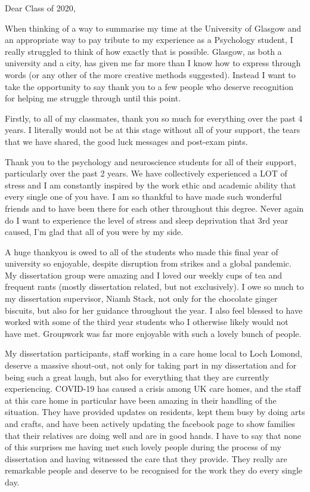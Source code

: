 \documentclass[]{book}
\begin{document}
\begin{info2}
Dear Class of 2020,

When thinking of a way to summarise my time at the University of Glasgow
and an appropriate way to pay tribute to my experience as a Psychology
student, I really struggled to think of how exactly that is possible.
Glasgow, as both a university and a city, has given me far more than I
know how to express through words (or any other of the more creative
methods suggested). Instead I want to take the opportunity to say thank
you to a few people who deserve recognition for helping me struggle
through until this point.

Firstly, to all of my classmates, thank you so much for everything over
the past 4 years. I literally would not be at this stage without all of
your support, the tears that we have shared, the good luck messages and
post-exam pints.

Thank you to the psychology and neuroscience students for all of their
support, particularly over the past 2 years. We have collectively
experienced a LOT of stress and I am constantly inspired by the work
ethic and academic ability that every single one of you have. I am so
thankful to have made such wonderful friends and to have been there for
each other throughout this degree. Never again do I want to experience
the level of stress and sleep deprivation that 3rd year caused, I'm glad
that all of you were by my side.

A huge thankyou is owed to all of the students who made this final year
of university so enjoyable, despite disruption from strikes and a global
pandemic. My dissertation group were amazing and I loved our weekly cups
of tea and frequent rants (mostly dissertation related, but not
exclusively). I owe so much to my dissertation supervisor, Niamh Stack,
not only for the chocolate ginger biscuits, but also for her guidance
throughout the year. I also feel blessed to have worked with some of the
third year students who I otherwise likely would not have met. Groupwork
was far more enjoyable with such a lovely bunch of people.

My dissertation participants, staff working in a care home local to Loch
Lomond, deserve a massive shout-out, not only for taking part in my
dissertation and for being such a great laugh, but also for everything
that they are currently experiencing. COVID-19 has caused a crisis among
UK care homes, and the staff at this care home in particular have been
amazing in their handling of the situation. They have provided updates
on residents, kept them busy by doing arts and crafts, and have been
actively updating the facebook page to show families that their
relatives are doing well and are in good hands. I have to say that none
of this surprises me having met such lovely people during the process of
my dissertation and having witnessed the care that they provide. They
really are remarkable people and deserve to be recognised for the work
they do every single day.


\end{info2}
\end{document}
